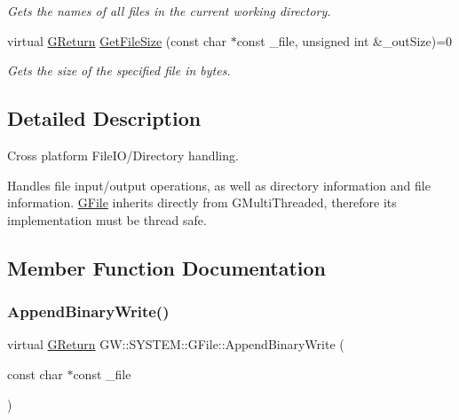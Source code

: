 \begin{DoxyCompactItemize}
\begin{DoxyCompactList}\small\item\em Gets the names of all files in the current working directory. \end{DoxyCompactList}\item 
virtual \mbox{\hyperlink{namespace_g_w_a67a839e3df7ea8a5c5686613a7a3de21}{G\+Return}} \mbox{\hyperlink{class_g_w_1_1_s_y_s_t_e_m_1_1_g_file_a2f4cba2dad96fa4c894545f43fee64b5}{Get\+File\+Size}} (const char $\ast$const \+\_\+file, unsigned int \&\+\_\+out\+Size)=0
\begin{DoxyCompactList}\small\item\em Gets the size of the specified file in bytes. \end{DoxyCompactList}\end{DoxyCompactItemize}


\subsection{Detailed Description}
Cross platform File\+I\+O/\+Directory handling. 

Handles file input/output operations, as well as directory information and file information. \mbox{\hyperlink{class_g_w_1_1_s_y_s_t_e_m_1_1_g_file}{G\+File}} inherits directly from G\+Multi\+Threaded, therefore its implementation must be thread safe. 

\subsection{Member Function Documentation}
\mbox{\label{class_g_w_1_1_s_y_s_t_e_m_1_1_g_file_a63311236692181f99fd393fe8e1ca9fc}} 
\subsubsection{\texorpdfstring{Append\+Binary\+Write()}{AppendBinaryWrite()}}
{\footnotesize\ttfamily virtual \mbox{\hyperlink{namespace_g_w_a67a839e3df7ea8a5c5686613a7a3de21}{G\+Return}} G\+W\+::\+S\+Y\+S\+T\+E\+M\+::\+G\+File\+::\+Append\+Binary\+Write (\begin{DoxyParamCaption}\item[{const char $\ast$const}]{\+\_\+file }\end{DoxyParamCaption})\hspace{0.3cm}{\ttfamily [pure virtual]}}




